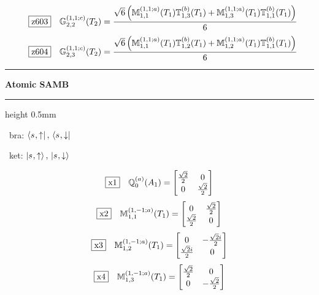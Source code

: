 \documentclass[fleqn,10pt,landscape]{jsarticle}
\begin{document}
\begin{dmath*}
\hspace*{3mm}\fbox{z603}\quad \mathbb{G}_{2,2}^{(1,1;c)}(T_{2})=\frac{\sqrt{6} \left(\mathbb{M}_{1,1}^{(1,1;a)}(T_{1}) \mathbb{T}_{1,3}^{(b)}(T_{1}) + \mathbb{M}_{1,3}^{(1,1;a)}(T_{1}) \mathbb{T}_{1,1}^{(b)}(T_{1})\right)}{6}
\end{dmath*}
\begin{dmath*}
\hspace*{3mm}\fbox{z604}\quad \mathbb{G}_{2,3}^{(1,1;c)}(T_{2})=\frac{\sqrt{6} \left(\mathbb{M}_{1,1}^{(1,1;a)}(T_{1}) \mathbb{T}_{1,2}^{(b)}(T_{1}) + \mathbb{M}_{1,2}^{(1,1;a)}(T_{1}) \mathbb{T}_{1,1}^{(b)}(T_{1})\right)}{6}
\end{dmath*}
\vspace{5mm}

\vspace{5mm}
\noindent \rule[0.5mm]{5mm}{0.5mm}\hspace{3mm}\textbf{Atomic SAMB}\hspace{3mm}\leaders\hrule height 0.5mm\hfill\kern0pt
\vspace{3mm}

\vspace{5mm}

\noindent\textbullet\, bra: $\bra{s_{},\uparrow},\, \bra{s_{},\downarrow}$

\noindent\textbullet\, ket: $\ket{s_{},\uparrow},\, \ket{s_{},\downarrow}$

\begin{dmath*}
\fbox{x1}\quad \mathbb{Q}_{0}^{(a)}(A_{1})=\begin{bmatrix} \frac{\sqrt{2}}{2} & 0 \\ 0 & \frac{\sqrt{2}}{2} \end{bmatrix}
\end{dmath*}
\begin{dmath*}
\fbox{x2}\quad \mathbb{M}_{1,1}^{(1,-1;a)}(T_{1})=\begin{bmatrix} 0 & \frac{\sqrt{2}}{2} \\ \frac{\sqrt{2}}{2} & 0 \end{bmatrix}
\end{dmath*}
\begin{dmath*}
\fbox{x3}\quad \mathbb{M}_{1,2}^{(1,-1;a)}(T_{1})=\begin{bmatrix} 0 & - \frac{\sqrt{2} i}{2} \\ \frac{\sqrt{2} i}{2} & 0 \end{bmatrix}
\end{dmath*}
\begin{dmath*}
\fbox{x4}\quad \mathbb{M}_{1,3}^{(1,-1;a)}(T_{1})=\begin{bmatrix} \frac{\sqrt{2}}{2} & 0 \\ 0 & - \frac{\sqrt{2}}{2} \end{bmatrix}
\end{dmath*}
\vspace{5mm}
\end{document}
